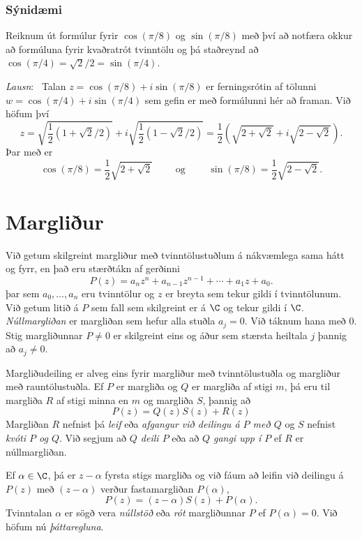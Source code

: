 \subsubsection{Sýnidæmi} \label{sy:raetur} Reiknum út formúlur fyrir $\cos(\pi/8)$
og $\sin(\pi/8)$ með því að notfæra okkur að
formúluna fyrir kvaðratrót tvinntölu og þá staðreynd
að $\cos(\pi/4)=\sqrt 2/2=\sin(\pi/4)$.  

\smallskip\noindent
{\it Lausn}: \ Talan $z=\cos(\pi/8)+i\sin(\pi/8)$ er
ferningsrótin af tölunni $w=\cos(\pi/4)+i\sin(\pi/4)$
sem gefin er með formúlunni hér að framan.  Við höfum því
$$
z=\sqrt{\dfrac 12(1+\sqrt 2/2)}+i\sqrt{\dfrac 12(1-
\sqrt 2/2)}=\dfrac 12(\sqrt{2+\sqrt 2}+i\sqrt{2-\sqrt 2}).
$$
Þar með er 
$$
\cos(\pi/8)=\dfrac 12\sqrt{2+\sqrt 2}\qquad \text{ og } \qquad
\sin(\pi/8)=\dfrac 12\sqrt{2-\sqrt 2}.
$$



\section{Margliður}

Við getum skilgreint margliður með tvinntölustuðlum á nákvæmlega sama
hátt og fyrr, en það eru stærðtákn af gerðinni
$$
P(z)=a_nz^n+a_{n-1}z^{n-1}+\cdots+a_1z+a_0.
$$
þar sem $a_0,\dots,a_n$ eru tvinntölur og $z$ er breyta sem tekur
gildi í tvinntölunum.  Við getum litið á $P$ sem fall sem skilgreint
er á $\C$ og tekur gildi í $\C$.  {\it Núllmargliðan} er margliðan sem
hefur alla stuðla $a_j=0$.  Við táknum hana með $0$.
Stig margliðunnar $P\neq 0$ er skilgreint eins og áður sem stærsta 
heiltala $j$ þannig að $a_j\neq 0$.  


Margliðudeiling er alveg eins fyrir margliður með tvinntölustuðla og
margliður með rauntölustuðla.  Ef $P$ er margliða  og 
$Q$ er margliða af stigi $m$, þá eru til margliða  $R$ af stigi minna en $m$
og margliða $S$, þannig að
$$
P(z)=Q(z)S(z)+R(z)
$$ 
Margliðan $R$ nefnist þá {\it leif} eða {\it afgangur við deilingu á
$P$ með $Q$} og $S$ nefnist {\it kvóti $P$ og $Q$}.  Við segjum að 
{\it $Q$ deili $P$} eða að {\it $Q$ gangi upp í $P$} ef $R$ er
núllmargliðan.  

Ef $\alpha\in \C$, þá er $z-\alpha$ fyrsta stigs margliða og við fáum
að leifin við deilingu á $P(z)$ með $(z-\alpha)$ verður fastamargliðan
$P(\alpha)$,
$$
P(z)=(z-\alpha)S(z)+P(\alpha).
$$
Tvinntalan $\alpha$ er sögð vera {\it núllstöð} eða {\it rót}
margliðunnar $P$ ef $P(\alpha)=0$.   Við höfum nú {\it  þáttaregluna}.

